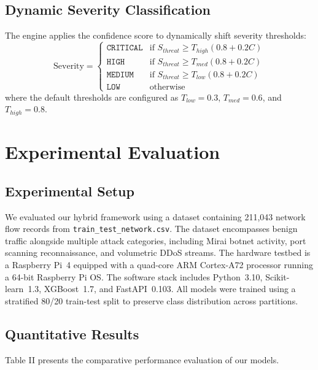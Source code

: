 \documentclass[journal]{IEEEtran}
\begin{document}
\subsection{Dynamic Severity Classification}
The engine applies the confidence score to dynamically shift severity thresholds:
\begin{equation}
\text{Severity} = \begin{cases} \texttt{CRITICAL} & \text{if } S_{threat} \geq T_{high}(0.8 + 0.2C) \\ \texttt{HIGH} & \text{if } S_{threat} \geq T_{med}(0.8 + 0.2C) \\ \texttt{MEDIUM} & \text{if } S_{threat} \geq T_{low}(0.8 + 0.2C) \\ \texttt{LOW} & \text{otherwise} \end{cases}
\end{equation}
where the default thresholds are configured as $T_{low} = 0.3$, $T_{med} = 0.6$, and $T_{high} = 0.8$.

\section{Experimental Evaluation}

\subsection{Experimental Setup}

We evaluated our hybrid framework using a dataset containing
211,043 network flow records from \texttt{train\_test\_network.csv}.
The dataset encompasses benign traffic alongside multiple
attack categories, including Mirai botnet activity, port scanning
reconnaissance, and volumetric DDoS streams. The hardware
testbed is a Raspberry Pi~4 equipped with a quad-core ARM
Cortex-A72 processor running a 64-bit Raspberry Pi OS. The
software stack includes Python~3.10, Scikit-learn~1.3,
XGBoost~1.7, and FastAPI~0.103. All models were trained using
a stratified 80/20 train-test split to preserve class distribution
across partitions.

\subsection{Quantitative Results}
Table II presents the comparative performance evaluation of our models.
\end{document}
